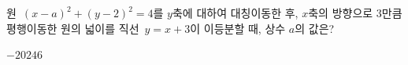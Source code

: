 원~$(x-a)^2+(y-2)^2=4$를 $y$축에 대하여 대칭이동한 후, $x$축의 방향으로 $3$만큼 평행이동한 원의 넓이를 직선~$y=x+3$이 이등분할 때, 상수 $a$의 값은?
\begin{choices32}{$-2$}{$0$}{$2$}{$4$}{$6$}\end{choices32}
